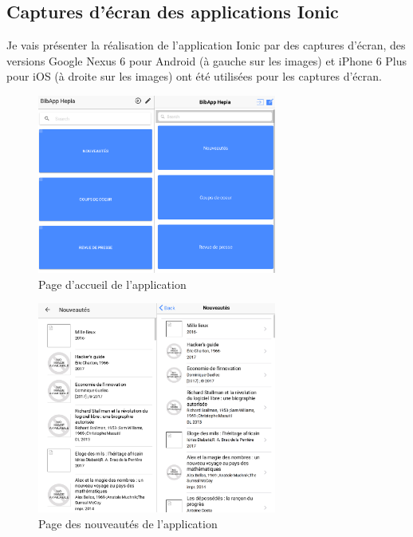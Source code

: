 \documentclass[a4paper, 12pt]{article}
\begin{document}
\subsection{Captures d'écran des applications Ionic}
Je vais présenter la réalisation de l'application Ionic par des captures d'écran, des versions Google Nexus 6 
pour Android (à gauche sur les images) et iPhone 6 Plus pour iOS (à droite sur les images) ont été utilisées pour les 
captures d'écran.
\begin{figure}
    \begin{center}
        \includegraphics[width=0.7\textwidth]{images/screenshots/android_iphone_1.png}
    \end{center}
    \caption{Page d'accueil de l'application}
\end{figure}
\begin{figure}
    \begin{center}
        \includegraphics[width=0.7\textwidth]{images/screenshots/android_iphone_2.png}
    \end{center}
    \caption{Page des nouveautés de l'application}
\end{figure}
\end{document}
